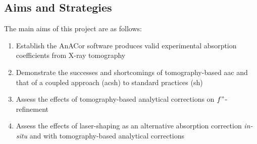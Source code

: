 \subsection{Aims and Strategies}

The main aims of this project are as follows:

\begin{enumerate}
    \item Establish the AnACor software produces valid experimental absorption coefficients from X-ray tomography
    \item Demonstrate the successes and shortcomings of tomography-based \ac{aac} and that of a coupled approach (\ac{acsh}) to standard practices (\ac{sh})
    \item Assess the effects of tomography-based analytical corrections on $f"$-refinement
    \item Assess the effects of laser-shaping as an alternative absorption correction \textit{in-situ} and with tomography-based analytical corrections
\end{enumerate}